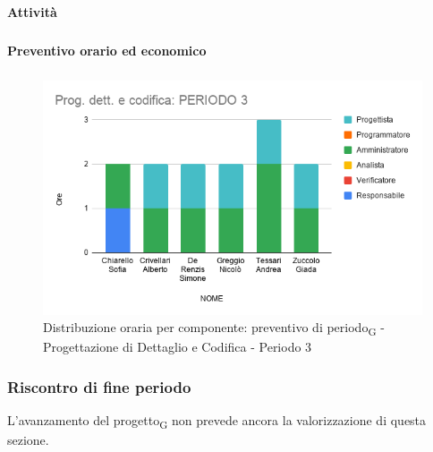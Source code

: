 
\paragraph{Attività}
\subparagraph*{}

\planningTable{
	
}



\paragraph{Preventivo orario ed economico}
\subparagraph*{}

\contabilitaTable{
	
}

\begin{figure}[H]
	\centering
	\includegraphics[scale=0.6]{res/images/charts/preventivo/prog_dett_3.png}
	\caption{Distribuzione oraria per componente: preventivo di periodo\textsubscript{G} - Progettazione di Dettaglio e Codifica - Periodo 3}
\end{figure}



\subsubsection{Riscontro di fine periodo}


L'avanzamento del progetto\textsubscript{G} non prevede ancora la valorizzazione di questa sezione.
